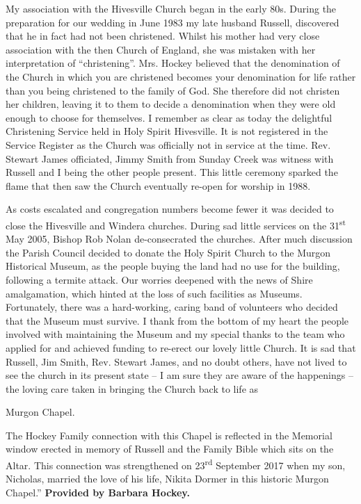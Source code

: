 My association with the Hivesville Church began in the early 80s. During the preparation for our wedding in June 1983 my late husband Russell, discovered that he in fact had not been christened. Whilst his mother had very close association with the then Church of England, she was mistaken with her interpretation of ``christening''. Mrs. Hockey believed that the denomination of the Church in which you are christened becomes your denomination for life rather than you being christened to the family of God. She therefore did not christen her children, leaving it to them to decide a denomination when they were old enough to choose for themselves. I remember as clear as today the delightful Christening Service held in Holy Spirit Hivesville. It is not registered in the Service Register as the Church was officially not in service at the time. Rev. Stewart James officiated, Jimmy Smith from Sunday Creek was witness with Russell and I being the other people present. This little ceremony sparked the flame that then saw the Church eventually re-open for worship in 1988.

As costs escalated and congregation numbers become fewer it was decided to close the Hivesville and Windera churches. During sad little services on the 31\textsuperscript{st} May 2005, Bishop Rob Nolan de-consecrated the churches. After much discussion the Parish Council decided to donate the Holy Spirit Church to the Murgon Historical Museum, as the people buying the land had no use for the building, following a termite attack. Our worries deepened with the news of Shire amalgamation, which hinted at the loss of such facilities as Museums. Fortunately, there was a hard-working, caring band of volunteers who decided that the Museum must survive. I thank from the bottom of my heart the people involved with maintaining the Museum and my special thanks to the team who applied for and achieved funding to re-erect our lovely little Church. It is sad that Russell, Jim Smith, Rev. Stewart James, and no doubt others, have not lived to see the church in its present state -- I am sure they are aware of the happenings -- the loving care taken in bringing the Church back to life as

Murgon Chapel.

The Hockey Family connection with this Chapel is reflected in the Memorial window erected in memory of Russell and the Family Bible which sits on the Altar. This connection was strengthened on 23\textsuperscript{rd} September 2017 when my son, Nicholas, married the love of his life, Nikita Dormer in this historic Murgon Chapel.'' \textbf{Provided by Barbara Hockey.}

